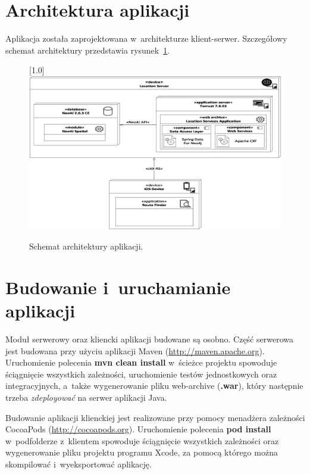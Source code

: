 \documentclass[a4paper,12pt]{article}
\begin{document}
	\section*{Architektura aplikacji}

	Aplikacja została zaprojektowana w~architekturze klient-serwer. Szczegółowy schemat architektury przedstawia rysunek~\ref{fig:architecture}. 

	\begin{figure}[ht!]
		\centering
		\scalebox{0.7}[1.0]{
			\includegraphics{graphics/architecture.eps}
		}

		\caption{Schemat architektury aplikacji.}
		\label{fig:architecture}
	\end{figure}

	\section*{Budowanie i~uruchamianie aplikacji}

	Moduł serwerowy oraz kliencki aplikacji budowane są osobno. Część serwerowa jest budowana przy użyciu aplikacji Maven (\url{http://maven.apache.org}). Uruchomienie polecenia \textbf{mvn clean install} w~ścieżce projektu spowoduje ściągnięcie wszystkich zależności, uruchomienie testów jednostkowych oraz integracyjnych, a~także wygenerowanie pliku web-archive (\textbf{.war}), który następnie trzeba \emph{zdeployować} na serwer aplikacji Java.

	Budowanie aplikacji klienckiej jest realizowane przy pomocy menadżera zależności CocoaPods (\url{http://cocoapods.org}). Uruchomienie polecenia \textbf{pod install} w~podfolderze z~klientem spowoduje ściągnięcie wszystkich zależności oraz wygenerowanie pliku projektu programu Xcode, za pomocą którego można skompilować i~wyeksportować aplikację.
\end{document}
